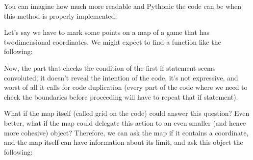 \documentclass[a4paper,10pt,english]{sphinxmanual}
\begin{document}
You can imagine how much more readable and Pythonic the code can be when this method is properly implemented.

Let’s say we have to mark some points on a map of a game that has two\sphinxhyphen{}dimensional coordinates. We might expect to find a
function like the following:

\begin{sphinxVerbatim}[commandchars=\\\{\}]
  
               
        \PYG{p}{[}\PYG{p}{]}  
\end{sphinxVerbatim}

Now, the part that checks the condition of the first if statement seems convoluted; it doesn’t reveal the intention of
the code, it’s not expressive, and worst of all it calls for code duplication (every part of the code where we need to
check the boundaries before proceeding will have to repeat that if statement).

What if the map itself (called grid on the code) could answer this question? Even better, what if the map could delegate
this action to an even smaller (and hence more cohesive) object? Therefore, we can ask the map if it contains a
coordinate, and the map itself can have information about its limit, and ask this object the following:
\end{document}
